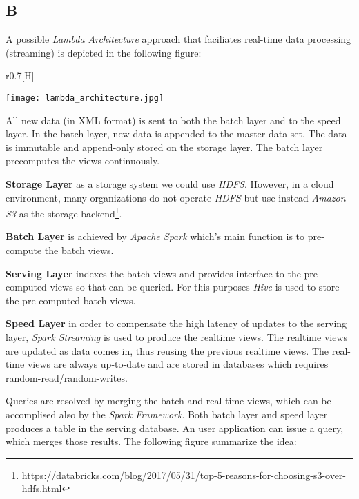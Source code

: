 \documentclass[format=acmsmall, review=false, screen=true]{acmart}
\begin{document}
\subsection{B}

A possible \textit{Lambda Architecture} approach that faciliates real-time data processing (streaming) is depicted in the following figure:

\begin{wrapfigure}{r}{0.7\textwidth}[H]
\begin{center}
  \texttt{[image: lambda\_architecture.jpg]}
  \caption{A possible \textit{Lambda Architecture} approach that faciliates real-time data processing (streaming)}
  \label{fig:lambda-architecture}
\end{center}
\end{wrapfigure}

\newpage

All new data (in XML format) is sent to both the batch layer and to the speed layer. In the batch layer, new data is appended to the master data set. The data is immutable and append-only stored on the storage layer. The batch layer precomputes the views continuously.

\textbf{Storage Layer} as a storage system we could use \textit{HDFS}. However, in a cloud environment, many organizations do not operate \textit{HDFS} but use instead \textit{Amazon S3} as the storage backend\footnote{\url{https://databricks.com/blog/2017/05/31/top-5-reasons-for-choosing-s3-over-hdfs.html}}. 

\textbf{Batch Layer} is achieved by \textit{Apache Spark} which's main function is to pre-compute the batch views.

\textbf{Serving Layer} indexes the batch views and provides interface to the pre-computed views so that can be queried. For this purposes \textit{Hive} is used to store the pre-computed batch views.

\textbf{Speed Layer} in order to compensate the high latency of updates to the serving layer, \textit{Spark Streaming} is used to produce the realtime views. The realtime views are updated as data comes in, thus reusing the previous realtime views. The real-time views are always up-to-date and are stored in databases which requires random-read/random-writes.

Queries are resolved by merging the batch and real-time views, which can be accomplised also by the \textit{Spark Framework}. Both batch layer and speed layer produces a table in the serving database. An user application can issue a query, which merges those results. The following figure summarize the idea:
\end{document}
